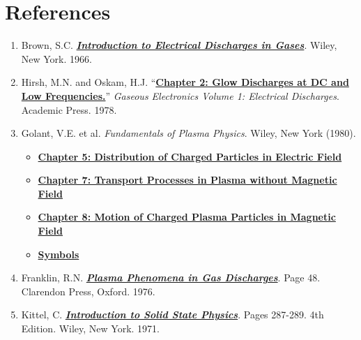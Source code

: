 \documentclass{../lab}
\begin{document}
\section{References}
\label{sec:References}

\begin{enumerate}
    \item Brown, S.C. \href{https://drive.google.com/file/d/13lCSORg9i628MBE-41tIWWlO9mgfPGAh/view?usp=drive_link}{\textbf{\emph{Introduction to Electrical Discharges in Gases}}}. Wiley, New York. 1966.
    
    \item Hirsh, M.N. and Oskam, H.J. ``\href{https://drive.google.com/file/d/1xRm-TWQeQdUvkc_2K_Mx_C65Uyy3vAF1/view?usp=drive_link}{\textbf{Chapter 2: Glow Discharges at DC and Low Frequencies.}}'' \emph{Gaseous Electronics Volume 1: Electrical Discharges}. Academic Press. 1978.

    \item Golant, V.E. et al. 
    \emph{Fundamentals of Plasma Physics}. Wiley, New York (1980).
    \begin{itemize} 
        \item \href{https://drive.google.com/file/d/16DYzs8FE0zqM0pE55U0QmHieNm6F9Vqe/view?usp=drive_link}{\textbf{Chapter 5: Distribution of Charged Particles in Electric Field}}
        \item \href{https://drive.google.com/file/d/1qeMnahB4ssn5VG9DqfzOdqOLuFcaO2Ux/view?usp=drive_link}{\textbf{Chapter 7: Transport Processes in Plasma without Magnetic Field}}
        \item \href{https://drive.google.com/file/d/1vXEaYF6dHfFhtxvSEicwee_s1gML_y8t/view?usp=drive_link}{\textbf{Chapter 8: Motion of Charged Plasma Particles in Magnetic Field}}
        \item \href{https://drive.google.com/file/d/1kFUUhMjq8B62mbd768fP91x_4AtDnnX-/view?usp=drive_link}{\textbf{Symbols}}
        
    \end{itemize}

    \item Franklin, R.N. \href{https://drive.google.com/file/d/12XvGyXPTrjZMhkVMifZa1G1k1OgWyg2W/view?usp=drive_link}{\textbf{\emph{Plasma Phenomena in Gas Discharges}}}. Page 48. Clarendon Press, Oxford. 1976.

    \item Kittel, C. \href{https://drive.google.com/file/d/1yKhdCGwMubg6uIXNCMTjJwNK5Hg-LDqr/view?usp=drive_link}{\textbf{\emph{Introduction to Solid State Physics}}}. Pages 287-289. 4th Edition. Wiley, New York. 1971.


\end{enumerate}
\end{document}
